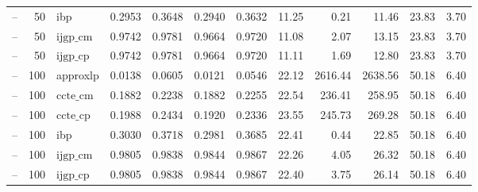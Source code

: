 \begin{table}[ht]
\begin{tabular}{lrlrrrrrrrrr}
-- & 50 & ibp & 0.2953 & 0.3648 & 0.2940 & 0.3632 & 11.25 & 0.21 & 11.46 & 23.83 & 3.70 \\
-- & 50 & $\text{ijgp\_cm}$ & 0.9742 & 0.9781 & 0.9664 & 0.9720 & 11.08 & 2.07 & 13.15 & 23.83 & 3.70 \\
-- & 50 & $\text{ijgp\_cp}$ & 0.9742 & 0.9781 & 0.9664 & 0.9720 & 11.11 & 1.69 & 12.80 & 23.83 & 3.70 \\
-- & 100 & approxlp & 0.0138 & 0.0605 & 0.0121 & 0.0546 & 22.12 & 2616.44 & 2638.56 & 50.18 & 6.40 \\
-- & 100 & $\text{ccte\_cm}$ & 0.1882 & 0.2238 & 0.1882 & 0.2255 & 22.54 & 236.41 & 258.95 & 50.18 & 6.40 \\
-- & 100 & $\text{ccte\_cp}$ & 0.1988 & 0.2434 & 0.1920 & 0.2336 & 23.55 & 245.73 & 269.28 & 50.18 & 6.40 \\
-- & 100 & ibp & 0.3030 & 0.3718 & 0.2981 & 0.3685 & 22.41 & 0.44 & 22.85 & 50.18 & 6.40 \\
-- & 100 & $\text{ijgp\_cm}$ & 0.9805 & 0.9838 & 0.9844 & 0.9867 & 22.26 & 4.05 & 26.32 & 50.18 & 6.40 \\
-- & 100 & $\text{ijgp\_cp}$ & 0.9805 & 0.9838 & 0.9844 & 0.9867 & 22.40 & 3.75 & 26.14 & 50.18 & 6.40 \\
\bottomrule
\end{tabular}
\end{table}
